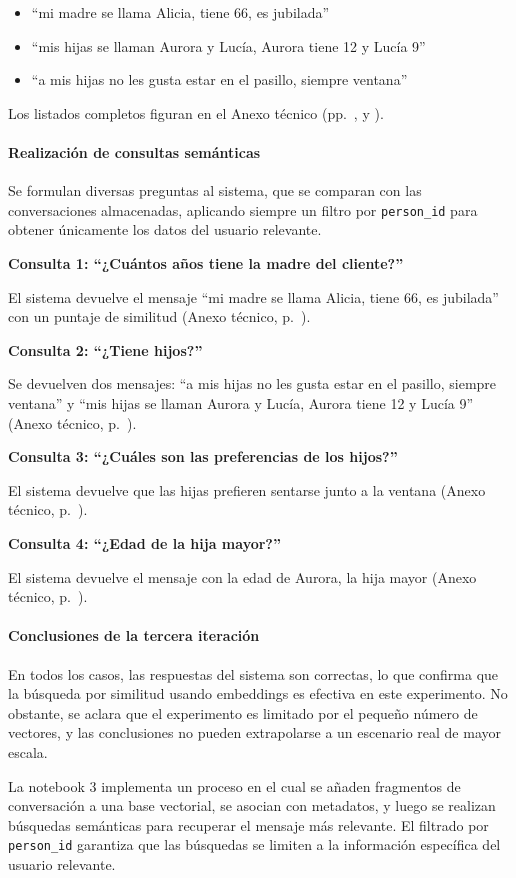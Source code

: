\begin{itemize}
    \item ``mi madre se llama Alicia, tiene 66, es jubilada''
    \item ``mis hijas se llaman Aurora y Lucía, Aurora tiene 12 y Lucía 9''
    \item ``a mis hijas no les gusta estar en el pasillo, siempre ventana''
\end{itemize}

Los listados completos figuran en el Anexo técnico (pp.~\pageref{anexo:code-4-1-3-2}, \pageref{anexo:code-4-1-3-3} y \pageref{anexo:code-4-1-3-4}).

\paragraph{Realización de consultas semánticas}

Se formulan diversas preguntas al sistema, que se comparan con las conversaciones almacenadas, aplicando siempre un filtro por \texttt{person\_id} para obtener únicamente los datos del usuario relevante.

\textbf{Consulta 1: ``¿Cuántos años tiene la madre del cliente?''}

El sistema devuelve el mensaje ``mi madre se llama Alicia, tiene 66, es jubilada'' con un puntaje de similitud (Anexo técnico, p.~\pageref{anexo:code-4-1-3-5}).

\textbf{Consulta 2: ``¿Tiene hijos?''}

Se devuelven dos mensajes: ``a mis hijas no les gusta estar en el pasillo, siempre ventana'' y ``mis hijas se llaman Aurora y Lucía, Aurora tiene 12 y Lucía 9'' (Anexo técnico, p.~\pageref{anexo:code-4-1-3-6}).

\textbf{Consulta 3: ``¿Cuáles son las preferencias de los hijos?''}

El sistema devuelve que las hijas prefieren sentarse junto a la ventana (Anexo técnico, p.~\pageref{anexo:code-4-1-3-7}).

\textbf{Consulta 4: ``¿Edad de la hija mayor?''}

El sistema devuelve el mensaje con la edad de Aurora, la hija mayor (Anexo técnico, p.~\pageref{anexo:code-4-1-3-8}).

\paragraph{Conclusiones de la tercera iteración}

En todos los casos, las respuestas del sistema son correctas, lo que confirma que la búsqueda por similitud usando embeddings es efectiva en este experimento. No obstante, se aclara que el experimento es limitado por el pequeño número de vectores, y las conclusiones no pueden extrapolarse a un escenario real de mayor escala.

La notebook 3 implementa un proceso en el cual se añaden fragmentos de conversación a una base vectorial, se asocian con metadatos, y luego se realizan búsquedas semánticas para recuperar el mensaje más relevante. El filtrado por \texttt{person\_id} garantiza que las búsquedas se limiten a la información específica del usuario relevante. 